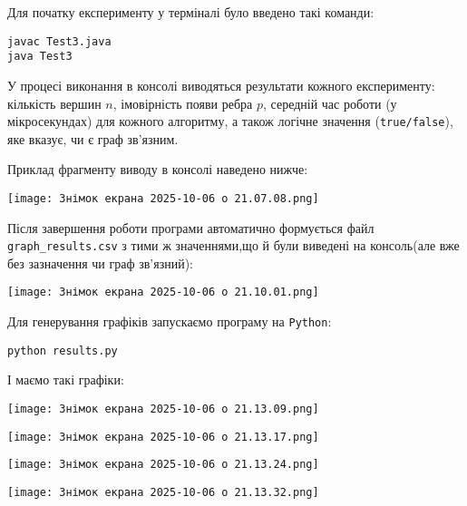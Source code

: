 \documentclass[12pt,a4paper]{article}
\begin{document}
Для початку експерименту у терміналі було введено такі команди:
\begin{verbatim}
javac Test3.java
java Test3
\end{verbatim}

У процесі виконання в консолі виводяться результати кожного експерименту:  
кількість вершин $n$, імовірність появи ребра $p$, 
середній час роботи (у мікросекундах) для кожного алгоритму, 
а також логічне значення (\texttt{true/false}), яке вказує, 
чи є граф зв’язним.  

Приклад фрагменту виводу в консолі наведено нижче:

\begin{center}
\texttt{[image: Знімок екрана 2025-10-06 о 21.07.08.png]}
\label{fig:console-output}
\end{center}

Після завершення роботи програми автоматично формується файл 
\texttt{graph\_results.csv} з тими ж значеннями,що й були виведені на консоль(але вже без зазначення чи граф зв'язний):

\begin{center}
\texttt{[image: Знімок екрана 2025-10-06 о 21.10.01.png]}
\label{fig:csv-output}
\end{center}

Для генерування графіків запускаємо програму на \texttt{Python}:
\begin{verbatim}
python results.py
\end{verbatim}

І маємо такі графіки:

\begin{center}
\texttt{[image: Знімок екрана 2025-10-06 о 21.13.09.png]}
\label{fig:csv-output}
\end{center}

\begin{center}
\texttt{[image: Знімок екрана 2025-10-06 о 21.13.17.png]}
\label{fig:csv-output}
\end{center}

\begin{center}
\texttt{[image: Знімок екрана 2025-10-06 о 21.13.24.png]}
\label{fig:csv-output}
\end{center}

\begin{center}
\texttt{[image: Знімок екрана 2025-10-06 о 21.13.32.png]}
\label{fig:csv-output}
\end{center}
\end{document}
